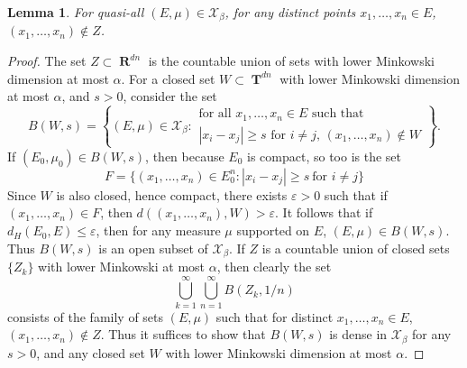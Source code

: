 \documentclass[12pt,reqno]{article}
\numberwithin{equation}{section}
\DeclareMathOperator{\RR}{\mathbf{R}}
\DeclareMathOperator{\TT}{\mathbf{T}}
\newtheorem{lemma}{Lemma}
\begin{document}
\begin{lemma}
    For quasi-all $(E,\mu) \in \mathcal{X}_\beta$, for any distinct points $x_1, \dots, x_n \in E$, $(x_1, \dots, x_n) \not \in Z$.
\end{lemma}
\begin{proof}
    The set $Z \subset \RR^{dn}$ is the countable union of sets with lower Minkowski dimension at most $\alpha$. For a closed set $W \subset \TT^{dn}$ with lower Minkowski dimension at most $\alpha$, and $s > 0$, consider the set
    \[ B(W,s) = \left\{ (E,\mu) \in \mathcal{X}_\beta: \begin{array}{c}
            \text{for all $x_1, \dots, x_n \in E$ such that}\\
            \text{$|x_i - x_j| \geq s$ for $i \neq j$, $(x_1, \dots, x_n) \not \in W$}
        \end{array} \right\}. \]
    If $(E_0,\mu_0) \in B(W,s)$, then because $E_0$ is compact, so too is the set
    \[ F = \{ (x_1,\dots,x_n) \in E_0^n : |x_i - x_j| \geq s\ \text{for $i \neq j$} \} \]
    Since $W$ is also closed, hence compact, there exists $\varepsilon > 0$ such that if $(x_1,\dots,x_n) \in F$, then $d((x_1,\dots,x_n),W) > \varepsilon$. It follows that if $d_H(E_0,E) \leq \varepsilon$, then for any measure $\mu$ supported on $E$, $(E,\mu) \in B(W,s)$. Thus $B(W,s)$ is an open subset of $\mathcal{X}_\beta$. If $Z$ is a countable union of closed sets $\{ Z_k \}$ with lower Minkowski at most $\alpha$, then clearly the set
    \[ \bigcup_{k = 1}^\infty \bigcup_{n = 1}^\infty B(Z_k,1/n) \]
    consists of the family of sets $(E,\mu)$ such that for distinct $x_1, \dots, x_n \in E$, $(x_1, \dots, x_n) \not \in Z$. Thus it suffices to show that $B(W,s)$ is dense in $\mathcal{X}_\beta$ for any $s > 0$, and any closed set $W$ with lower Minkowski dimension at most $\alpha$.


\end{proof}
\end{document}
